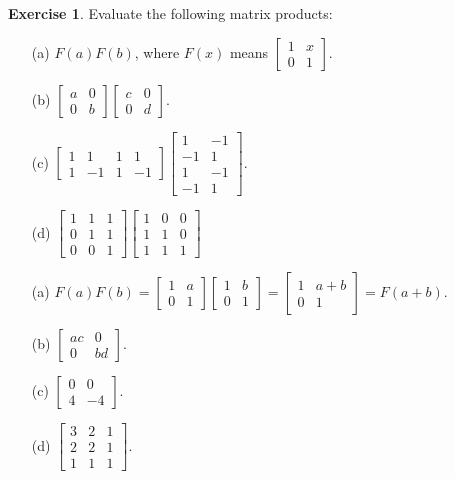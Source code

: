 \documentclass[a4paper]{book}
\newcommand{\bbm}       {\begin{bmatrix}}
\newcommand{\ebm}       {\end{bmatrix}}
\renewcommand{\:}{\colon}
\theoremstyle{definition}
\newtheorem{exercise}[theorem]{Exercise}
\renewenvironment{solution}{\SolutionInline}{\endSolutionInline}
\begin{document}
\begin{exercise}
 Evaluate the following matrix products:
 \begin{itemize}
 \item[(a)] $F(a)F(b)$, where $F(x)$ means $\bbm 1&x\\0&1\ebm$.
 \item[(b)] $\bbm a&0\\0&b\ebm \bbm c&0\\0&d\ebm$.
 \item[(c)] {\small $\bbm 1&1&1&1\\ 1&-1&1&-1\ebm
                     \bbm 1&-1\\ -1&1\\ 1&-1\\ -1&1\ebm$}.
 \item[(d)] {\small $\bbm 1&1&1\\0&1&1\\0&0&1\ebm
                     \bbm 1&0&0\\1&1&0\\1&1&1\ebm$}
 \end{itemize}
\end{exercise}
\begin{solution}
 \begin{itemize}
  \item[(a)] $F(a)F(b)=\bbm 1&a\\0&1\ebm \bbm 1&b\\0&1\ebm=
              \bbm 1&a+b\\0&1\ebm = F(a+b)$.
  \item[(b)] $\bbm ac&0\\0&bd \ebm$.
  \item[(c)] $\bbm 0&0\\4&-4\ebm$.
  \item[(d)] $\bbm 3&2&1\\2&2&1\\1&1&1 \ebm$.
 \end{itemize}
\end{solution}
\end{document}
